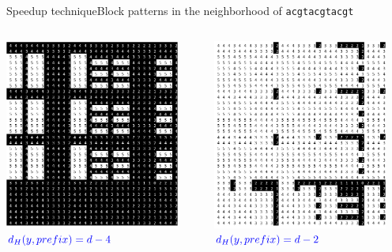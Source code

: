 \documentclass[pdf,xcolor={dvipsnames}]{beamer}
\begin{document}
\begin{frame}{Speedup technique}{Block patterns in the neighborhood of \texttt{acgtacgtacgt}}
\begin{columns}
\begin{column}{0.3\textwidth}
				\includegraphics[width=0.9\textwidth]{img/4.png}\\ $\color{blue}d_H(y,prefix) = d-4$\\\ \\
			\end{column}
			\begin{column}{0.3\textwidth}
				\centering
				\includegraphics[width=0.9\textwidth]{img/2.png}\\ $\color{blue}d_H(y,prefix) = d-2$\\\ \\

\end{column}
\end{columns}
\end{frame}
\end{document}
